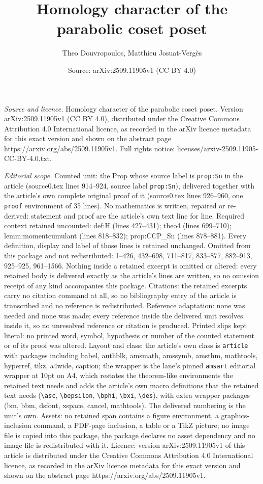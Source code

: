 \documentclass[10pt,a4paper]{amsart}
\title[Homology character of the parabolic coset poset]{Homology character of the parabolic coset poset}
\author{Theo Douvropoulos, Matthieu Josuat-Verg\`es}
\date{Source: arXiv:2509.11905v1 (CC BY 4.0)}
\begin{document}
\maketitle

\noindent\emph{Source and licence.} Homology character of the parabolic coset poset. Version arXiv:2509.11905v1 (CC BY 4.0), distributed under the Creative Commons Attribution 4.0 International licence, as recorded in the arXiv licence metadata for this exact version and shown on the abstract page https://arxiv.org/abs/2509.11905v1. Full rights notice: licenses/arxiv-2509.11905-CC-BY-4.0.txt.\par\smallskip

\noindent\textit{Editorial scope.} Counted unit: the Prop whose source label is \texttt{prop:Sn} in the article (source0.tex lines 914--924, source label \texttt{prop:Sn}), delivered together with the article's own complete original proof of it (source0.tex lines 926--960, one \texttt{proof} environment of 35 lines). No mathematics is written, repaired or re-derived: statement and proof are the article's own text line for line. Required context retained uncounted: def:H (lines 427--431); theo4 (lines 699--710); lemm:momentcumulant (lines 818--832); prop:CCP\_Sn (lines 878--881). Every definition, display and label of those lines is retained unchanged. Omitted from this package and not redistributed: 1--426, 432--698, 711--817, 833--877, 882--913, 925--925, 961--1566. Nothing inside a retained excerpt is omitted or altered: every retained body is delivered exactly as the article's lines are written, so no omission receipt of any kind accompanies this package. Citations: the retained excerpts carry no citation command at all, so no bibliography entry of the article is transcribed and no reference is redistributed. Reference adaptation: none was needed and none was made; every reference inside the delivered unit resolves inside it, so no unresolved reference or citation is produced. Printed slips kept literal: no printed word, symbol, hypothesis or number of the counted statement or of its proof was altered. Layout and class: the article's own class is \texttt{article} with packages including babel, authblk, amsmath, amssymb, amsthm, mathtools, hyperref, tikz, a4wide, caption; the wrapper is the lane's pinned \texttt{amsart} editorial wrapper at 10pt on A4, which restates the theorem-like environments the retained text needs and adds the article's own macro definitions that the retained text needs (\texttt{\textbackslash asc}, \texttt{\textbackslash bepsilon}, \texttt{\textbackslash bphi}, \texttt{\textbackslash bxi}, \texttt{\textbackslash des}), with extra wrapper packages (bm, bbm, dsfont, xspace, cancel, mathtools). The delivered numbering is the unit's own. Assets: no retained span contains a figure environment, a graphics-inclusion command, a PDF-page inclusion, a table or a TikZ picture; no image file is copied into this package, the package declares no asset dependency and no image file is redistributed with it. Licence: version arXiv:2509.11905v1 of this article is distributed under the Creative Commons Attribution 4.0 International licence, as recorded in the arXiv licence metadata for this exact version and shown on the abstract page https://arxiv.org/abs/2509.11905v1. 
\end{document}
